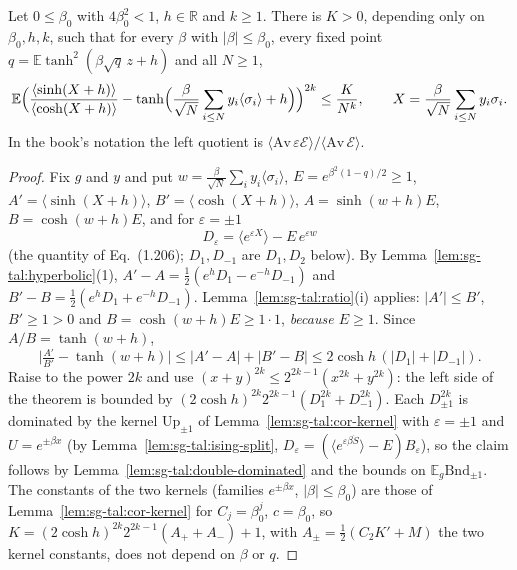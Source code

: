 \begin{theorem}
\label{thm:sg-tal:cor-1715-tanh}
  \leanok
{}
Let $0\le\beta_0$ with $4\beta_0^2<1$, $h\in\mathbb R$ and $k\ge1$.  There is $K>0$, depending only on $\beta_0,h,k$, such that for every $\beta$ with $|\beta|\le\beta_0$, every fixed point $q=\mathbb E\tanh^2(\beta\sqrt q\,z+h)$ and all $N\ge1$,
\[
\mathbb E\Bigl(\frac{\langle\sinh(X+h)\rangle}{\langle\cosh(X+h)\rangle}-\tanh\Bigl(\frac\beta{\sqrt N}\sum_{i\le N}y_i\langle\sigma_i\rangle+h\Bigr)\Bigr)^{2k}\le\frac K{N^k},\qquad X=\frac\beta{\sqrt N}\sum_{i\le N}y_i\sigma_i .
\]
In the book's notation the left quotient is $\langle\mathrm{Av}\,\varepsilon\mathcal E\rangle/\langle\mathrm{Av}\,\mathcal E\rangle$.
\end{theorem}
\begin{proof}
  \leanok
Fix $g$ and $y$ and put $w=\frac\beta{\sqrt N}\sum_iy_i\langle\sigma_i\rangle$, $E=e^{\beta^2(1-q)/2}\ge1$, $A'=\langle\sinh(X+h)\rangle$, $B'=\langle\cosh(X+h)\rangle$, $A=\sinh(w+h)E$, $B=\cosh(w+h)E$, and for $\varepsilon=\pm1$
\[
D_\varepsilon=\bigl\langle e^{\varepsilon X}\bigr\rangle-E\,e^{\varepsilon w}
\]
(the quantity of Eq.~(1.206); $D_1,D_{-1}$ are $D_1,D_2$ below).  By Lemma~\ref{lem:sg-tal:hyperbolic}(1), $A'-A=\frac12(e^hD_1-e^{-h}D_{-1})$ and $B'-B=\frac12(e^hD_1+e^{-h}D_{-1})$.
Lemma~\ref{lem:sg-tal:ratio}(i) applies: $|A'|\le B'$, $B'\ge1>0$ and $B=\cosh(w+h)E\ge1\cdot1$, \emph{because $E\ge1$}.  Since $A/B=\tanh(w+h)$,
\[
\bigl|\tfrac{A'}{B'}-\tanh(w+h)\bigr|\le|A'-A|+|B'-B|\le2\cosh h\,(|D_1|+|D_{-1}|).
\]
Raise to the power $2k$ and use $(x+y)^{2k}\le2^{2k-1}(x^{2k}+y^{2k})$: the left side of the theorem is bounded by $(2\cosh h)^{2k}2^{2k-1}(D_1^{2k}+D_{-1}^{2k})$.  Each $D_{\pm1}^{2k}$ is dominated by the kernel $\mathrm{Up}_{\pm1}$ of Lemma~\ref{lem:sg-tal:cor-kernel} with $\varepsilon=\pm1$ and $U=e^{\pm\beta x}$
(by Lemma~\ref{lem:sg-tal:ising-split}, $D_\varepsilon=(\langle e^{\varepsilon\beta\dot S}\rangle-E)B_\varepsilon$), so the claim follows by Lemma~\ref{lem:sg-tal:double-dominated} and the bounds on $\mathbb E_g\mathrm{Bnd}_{\pm1}$.  The constants of the two kernels (families $e^{\pm\beta x}$, $|\beta|\le\beta_0$) are those of Lemma~\ref{lem:sg-tal:cor-kernel} for $C_j=\beta_0^j$, $c=\beta_0$, so $K=(2\cosh h)^{2k}2^{2k-1}(A_++A_-)+1$, with $A_\pm=\frac12(C_2K'+M)$ the two kernel constants, does not depend on $\beta$ or $q$.
\end{proof}

